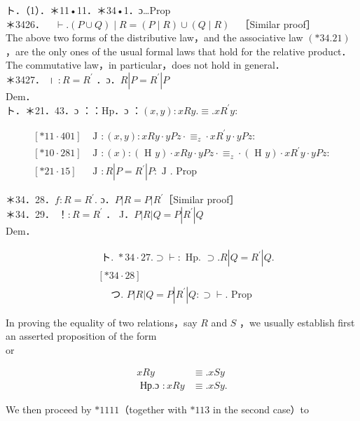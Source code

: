 \documentclass[10pt]{article}
\begin{document}
ト．（1）．＊11•11．＊34•1．ɔ…Prop\\
＊3426．$\quad \vdash .(P \cup Q) \mid R=(P \mid R) \cup(Q \mid R) \quad$［Similar proof］\\
The above two forms of the distributive law，and the associative law $(* 34.21)$ ，are the only ones of the usual formal laws that hold for the relative product．The commutative law，in particular，does not hold in general．\\
＊3427． । $: R=R^{\prime}$ ．ɔ．$R\left|P=R^{\prime}\right| P$\\
Dem．\\
ト．＊21．43．ɔ ：：Hp．ɔ ：$(x, y): x R y . \equiv . x R^{\prime} y:$

$$
\begin{array}{ll}
{[* 11 \cdot 401]} & \text { J }:(x, y): x R y \cdot y P z \cdot \equiv_{z} \cdot x R^{\prime} y \cdot y P z: \\
{[* 10 \cdot 281]} & \text { J }:(x):(\text { H } y) \cdot x R y \cdot y P z \cdot \equiv_{z} \cdot(\text { H } y) \cdot x R^{\prime} y \cdot y P z: \\
{[* 21 \cdot 15]} & \text { J }: R\left|P=R^{\prime}\right| P: \text { J } . \text { Prop }
\end{array}
$$

＊34．28．$f: R=R^{\prime}$. ɔ．$P|R=P| R^{\prime}$［Similar proof］\\
＊34．29． ！$: R=R^{\prime}$ ． J．$P|R| Q=P\left|R^{\prime}\right| Q$\\
Dem．

$$
\begin{aligned}
& \text { ト. } * 34 \cdot 27 . \supset \vdash: \text { Hp. } \supset . R\left|Q=R^{\prime}\right| Q . \\
& {[* 34 \cdot 28]} \\
& \quad \text { つ. } P|R| Q=P\left|R^{\prime}\right| Q: \supset \vdash . \text { Prop }
\end{aligned}
$$

In proving the equality of two relations，say $R$ and $S$ ，we usually establish first an asserted proposition of the form\\
or

$$
\begin{aligned}
x R y & \equiv . x S y \\
\text { Нр.ɔ }: x R y & \equiv . x S y .
\end{aligned}
$$

We then proceed by $* 1111$（together with $* 113$ in the second case）to
\end{document}
